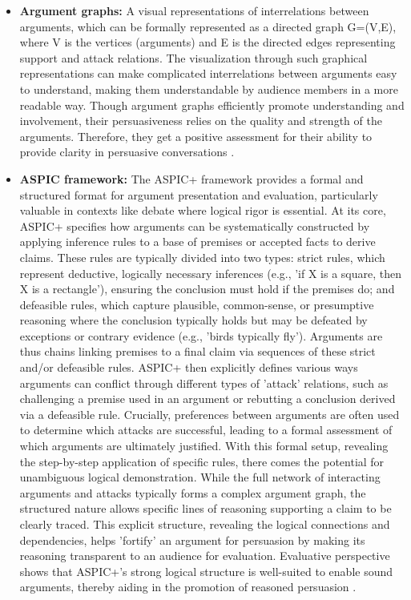 \documentclass[conference]{IEEEtran}
\begin{document}
\begin{itemize}
    \item \textbf{Argument graphs:} 
    A visual representations of interrelations between arguments, which can be formally represented as a directed graph G=(V,E), where V is the vertices (arguments) and E is the directed edges representing support and attack relations. The visualization through such graphical representations can make complicated interrelations between arguments easy to understand, making them understandable by audience members in a more readable way. Though argument graphs efficiently promote understanding and involvement, their persuasiveness relies on the quality and strength of the arguments. Therefore, they get a positive assessment for their ability to provide clarity in persuasive conversations \cite{chalaguine2020persuasive}\cite{engelmann2022argumentation}.

    \item \textbf{ASPIC framework:} 
    The ASPIC+ framework provides a formal and structured format for argument presentation and evaluation, particularly valuable in contexts like debate where logical rigor is essential. At its core, ASPIC+ specifies how arguments can be systematically constructed by applying inference rules to a base of premises or accepted facts to derive claims. These rules are typically divided into two types: strict rules, which represent deductive, logically necessary inferences (e.g., 'if X is a square, then X is a rectangle'), ensuring the conclusion must hold if the premises do; and defeasible rules, which capture plausible, common-sense, or presumptive reasoning where the conclusion typically holds but may be defeated by exceptions or contrary evidence (e.g., 'birds typically fly'). Arguments are thus chains linking premises to a final claim via sequences of these strict and/or defeasible rules. ASPIC+ then explicitly defines various ways arguments can conflict through different types of 'attack' relations, such as challenging a premise used in an argument or rebutting a conclusion derived via a defeasible rule. Crucially, preferences between arguments are often used to determine which attacks are successful, leading to a formal assessment of which arguments are ultimately justified. With this formal setup, revealing the step-by-step application of specific rules, there comes the potential for unambiguous logical demonstration. While the full network of interacting arguments and attacks typically forms a complex argument graph, the structured nature allows specific lines of reasoning supporting a claim to be clearly traced. This explicit structure, revealing the logical connections and dependencies, helps 'fortify' an argument for persuasion by making its reasoning transparent to an audience for evaluation. Evaluative perspective shows that ASPIC+'s strong logical structure is well-suited to enable sound arguments, thereby aiding in the promotion of reasoned persuasion \cite{engelmann2022argumentation}.


\end{itemize}
\end{document}
